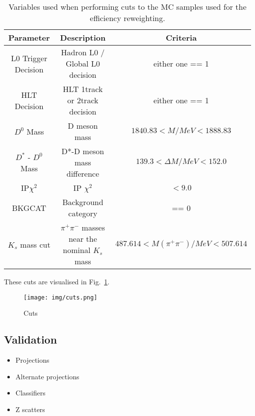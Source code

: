 \documentclass[note.tex]{subfiles}
\begin{document}
\begin{table}[ht]
    \centering
    \begin{tabular}{ | c | c | c |}
        \hline
        Parameter           & Description                                     & Criteria                                 \\
        \hline
        \hline
        L0 Trigger Decision & Hadron L0 / Global L0 decision                  & either one == 1                          \\

        HLT Decision        & HLT 1track or 2track decision                   & either one == 1                          \\

        $D^0$ Mass          & D meson mass                                    & $1840.83 < M/MeV < 1888.83$              \\

        $D^*$ - $D^0$ Mass  & D*-D meson mass difference                      & $139.3 < \Delta M/MeV < 152.0$           \\

        IP$\chi^2$          & IP $\chi^2$                                     & $< 9.0$                                  \\

        BKGCAT              & Background category                             & == 0                                     \\

        $K_s$ mass cut      & $\pi^+\pi^-$ masses near the nominal $K_s$ mass & $ 487.614 < M(\pi^+\pi^-)/MeV < 507.614$ \\
        \hline
    \end{tabular}
    \caption{Variables used when performing cuts to the MC samples used for the efficiency reweighting.}
    \label{cut vars}
    \centering
\end{table}

These cuts are visualised in Fig.~\ref{cuts hists}.
\begin{figure}
    \texttt{[image: img/cuts.png]}
    \centering
    \caption{Cuts}
    \label{cuts hists}
\end{figure}


\subsection{Validation}
\begin{itemize}
    \item Projections
    \item Alternate projections
    \item Classifiers
    \item Z scatters
\end{itemize}
\end{document}
